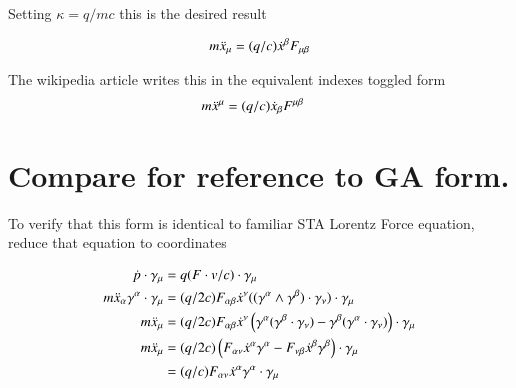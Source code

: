 \documentclass{article}
\begin{document}
Setting $\kappa = q/mc$ this is the desired result

\begin{align*}
m \ddot{x}_\mu &= (q/c) \dot{x}^\beta F_{\mu\beta} \\
\end{align*}

The wikipedia article \cite{wikiLorentzForce} writes this in the equivalent indexes toggled form
\begin{align*}
m \ddot{x}^\mu &= (q/c) \dot{x}_\beta F^{\mu\beta}
\end{align*}

%

\section{ Compare for reference to GA form. }

To verify that this form is identical to familiar STA Lorentz Force equation,
reduce that equation to coordinates

\begin{align*}
\dot{p} \cdot \gamma_\mu &= q (F \cdot v/c) \cdot \gamma_\mu \\
m \ddot{x}_\alpha \gamma^\alpha \cdot \gamma_\mu &= (q/2c) F_{\alpha\beta} \dot{x}^\nu
((\gamma^{\alpha} \wedge \gamma^{\beta}) \cdot \gamma_\nu) \cdot \gamma_\mu \\
m \ddot{x}_\mu &=
(q/2c) F_{\alpha\beta} \dot{x}^\nu \left( \gamma^{\alpha} (\gamma^{\beta} \cdot \gamma_\nu) -\gamma^{\beta} (\gamma^{\alpha} \cdot \gamma_\nu) \right) \cdot \gamma_\mu \\
m \ddot{x}_\mu &= 
(q/2c) \left( F_{\alpha\nu} \dot{x}^\alpha \gamma^{\alpha} - F_{\nu\beta} \dot{x}^\beta \gamma^{\beta} \right) \cdot \gamma_\mu \\
&= (q/c) F_{\alpha\nu} \dot{x}^\alpha \gamma^{\alpha} \cdot \gamma_\mu \\
\end{align*}
\end{document}
